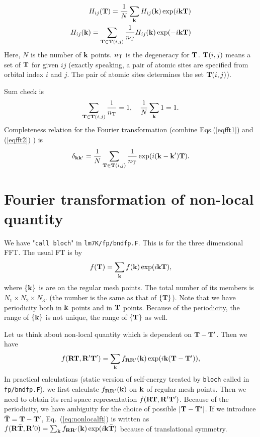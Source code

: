 \documentclass[a4paper,10pt,fleqn]{article}
\newcommand{\bfk}{{\bf k}}
\newcommand{\bfT}{{\bf T}}
\newcommand{\bfR}{{\bf R}}
\newcommand{\req}[1]{\mbox{Eq.~(\ref{#1})}}
\begin{document}
\begin{eqnarray}
H_{ij}(\bfT)= \frac{1}{N} \sum_\bfk H_{ij}(\bfk) \exp(i \bfk \bfT) \label{eqfft1} \\
H_{ij}(\bfk)= \sum_{\bfT \in \bfT(i,j)} \frac{1}{n_{\rm T}} H_{ij}(\bfk)
 \exp(-i \bfk \bfT)  \label{eqfft2}
\end{eqnarray}
Here, $N$ is the number of $\bfk$ points. $n_{\rm T}$ is the
degeneracy for $\bfT$. $\bfT(i,j)$ means a set of $\bfT$ for given $ij$
(exactly speaking, a pair of atomic sites are specified from  orbital index $i$ and $j$.
The pair of atomic sites determines the set $\bfT(i,j)$).

Sum check is
\begin{eqnarray}
\sum_{\bfT \in \bfT(i,j)} \frac{1}{n_{\rm T}} = 1, \ \ \
\frac{1}{N} \sum_\bfk 1 = 1.
\end{eqnarray}
Completeness relation for the Fourier transformation (combine
Eqs.(\ref{eqfft1}) and (\ref{eqfft2}) ) is
\begin{eqnarray}
\delta_{\bfk\bfk'}=  \frac{1}{N} \sum_{\bfT \in \bfT(i,j)}
 \frac{1}{n_{\rm T}} \exp(i (\bfk-\bfk')\bfT).
\end{eqnarray}


\section{Fourier transformation of non-local quantity}
We have "{\tt call bloch}" in {\tt lm7K/fp/bndfp.F}.
This is for the three dimensional FFT.
The usual FT is by
\begin{eqnarray}
f(\bfT)=\sum_\bfk f(\bfk) \exp(i \bfk \bfT),
\end{eqnarray}
where $\{\bfk\}$ is are on the regular mesh points.
The total number of its members is $N_1 \times N_2 \times N_3$.
(the number is the same as that of $\{\bfT\}$).
Note that we have periodicity both in $\bfk$ points
and in $\bfT$ points. Because of the periodicity, the range of $\{\bfk\}$
is not unique, the range of $\{\bfT\}$ as well.

Let us think about non-local quantity which is dependent on $\bfT-\bfT'$. Then we have
\begin{eqnarray}
f(\bfR\bfT,\bfR'\bfT')=\sum_\bfk 
f_{\bfR\bfR'}(\bfk) \exp(i \bfk (\bfT-\bfT')),
\label{eq:nonlocalft}
\end{eqnarray}
In practical calculations (static version of self-energy treated by
{\tt bloch} called in {\tt fp/bndfp.F}), 
we first calculate $f_{\bfR\bfR'}(\bfk)$ on $\bfk$ of regular mesh points. Then we
need to obtain its real-space representation
$f(\bfR\bfT,\bfR'\bfT')$. Because of the periodicity,
we have ambiguity for the choice of possible 
$|\bfT-\bfT'|$. If we introduce $\bar{\bf T}=\bfT-\bfT'$,
\req{eq:nonlocalft} is written as
$f(\bfR\bar{\bfT},\bfR'0)=\sum_\bfk 
f_{\bfR\bfR'}(\bfk) \exp(i \bfk \bar{\bfT})$ because of translational symmetry.
\end{document}
